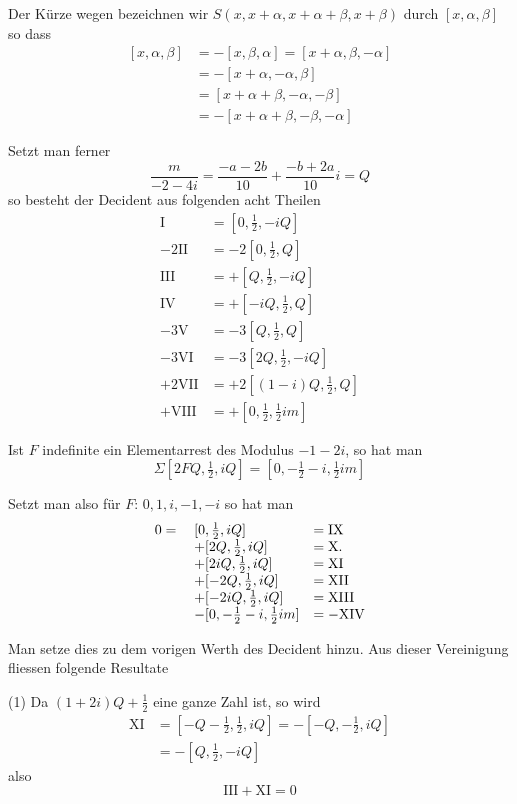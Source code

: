 Der Kürze wegen bezeichnen wir $S(x,x+\alpha,x+\alpha+\beta,x+\beta)$ durch $[x,\alpha,\beta]$ so dass
\[
\begin{aligned}
[x,\alpha,\beta]&=-[x,\beta,\alpha]=[x+\alpha,\beta,-\alpha]\\
&=-[x+\alpha,-\alpha,\beta]\\
&=[x+\alpha+\beta,-\alpha,-\beta]\\
&=-[x+\alpha+\beta,-\beta,-\alpha]
\end{aligned}
\]

Setzt man ferner
\[
\frac{m}{-2-4i}=\frac{-a-2b}{10}+\frac{-b+2a}{10}i=Q
\]
%
so besteht der Decident aus folgenden acht Theilen
\[
\begin{aligned}
\mathrm{I}&=[0,\tfrac12,-iQ]\\
-2\mathrm{II}&=-2[0,\tfrac12,Q]\\
\mathrm{III}&=+[Q,\tfrac12,-iQ]\\
\mathrm{IV}&=+[-iQ,\tfrac12,Q]\\
-3\mathrm{V}&=-3[Q,\tfrac12,Q]\\
-3\mathrm{VI}&=-3[2Q,\tfrac12,-iQ]\\
+2\mathrm{VII}&=+2[(1-i)Q,\tfrac12,Q]\\
+\mathrm{VIII}&=+[0,\tfrac12,\tfrac12im]
\end{aligned}
\]

Ist $F$ indefinite ein Elementarrest des Modulus $-1-2i$, so hat man
\[
\Sigma[2FQ,\tfrac12,iQ]=[0,-\tfrac12-i,\tfrac12im]
\]

Setzt man also für $F$: $0,1,i,-1,-i$ so hat man
\[
\begin{array}{rll}
0={}&[0,\tfrac12,iQ]&=\mathrm{IX}\\
&+[2Q,\tfrac12,iQ]&=\mathrm{X}\mathbin{.}\\
&+[2iQ,\tfrac12,iQ]&=\mathrm{XI}\\
&+[-2Q,\tfrac12,iQ]&=\mathrm{XII}\\
&+[-2iQ,\tfrac12,iQ]&=\mathrm{XIII}\\
&-[0,-\tfrac12-i,\tfrac12im]&=-\mathrm{XIV}
\end{array}
\]

Man setze dies zu dem vorigen Werth des Decident hinzu. Aus dieser Vereinigung fliessen folgende Resultate

(1) Da $(1+2i)Q+\frac12$ eine ganze Zahl ist, so wird
\[
\begin{aligned}
\mathrm{XI}&=[-Q-\tfrac12,\tfrac12,iQ]= -[-Q,-\tfrac12,iQ]\\
&=-[Q,\tfrac12,-iQ]
\end{aligned}
\]
also
\[
\mathrm{III}+\mathrm{XI}=0
\]

